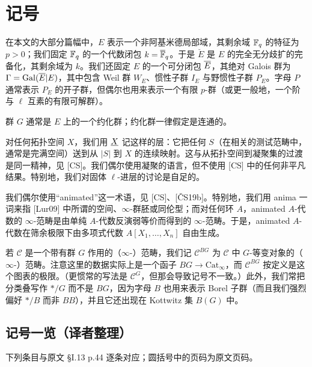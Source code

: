 \section{记号}

在本文的大部分篇幅中，$E$ 表示一个非阿基米德局部域，其剩余域 $\mathbb{F}_q$ 的特征为 $p>0$；我们固定 $\mathbb{F}_q$ 的一个代数闭包 $k=\overline{\mathbb{F}}_q$。于是 $\breve{E}$ 是 $E$ 的完全无分歧扩的完备化，其剩余域为 $k$。我们还固定 $E$ 的一个可分闭包 $\overline{E}$，其绝对 Galois 群为 $\Gamma=\operatorname{Gal}(\overline{E}|E)$，其中包含 Weil 群 $W_E$、惯性子群 $I_E$ 与野惯性子群 $P_E$。字母 $P$ 通常表示 $P_E$ 的开子群，但偶尔也用来表示一个有限 $p$-群（或更一般地，一个阶与 $\ell$ 互素的有限可解群）。

群 $G$ 通常是 $E$ 上的一个约化群；约化群一律假定是连通的。

对任何拓扑空间 $X$，我们用 $\underline{X}$ 记这样的层：它把任何 $S$（在相关的测试范畴中，通常是完满空间）送到从 $|S|$ 到 $X$ 的连续映射。这与从拓扑空间到凝聚集的过渡是同一精神，见 [CS]。我们偶尔使用凝聚的语言，但不使用 [CS] 中的任何非平凡结果。特别地，我们对固体 $\ell$-进层的讨论是自足的。

我们偶尔使用“animated”这一术语，见 [CS]、[\v{C}S19b]。特别地，我们用 anima 一词来指 [Lur09] 中所谓的空间、$\infty$-群胚或同伦型；而对任何环 $A$，animated $A$-代数的 $\infty$-范畴是由单纯 $A$-代数反演弱等价而得到的 $\infty$-范畴。于是，animated $A$-代数在筛余极限下由多项式代数 $A[X_1,\dots,X_n]$ 自由生成。

若 $\mathcal{C}$ 是一个带有群 $G$ 作用的（$\infty$-）范畴，我们记 $\mathcal{C}^{BG}$ 为 $\mathcal{C}$ 中 $G$-等变对象的（$\infty$-）范畴。注意这里的数据实际上是一个函子 $BG\to\mathrm{Cat}_\infty$，而 $\mathcal{C}^{BG}$ 按定义是这个图表的极限。（更惯常的写法是 $\mathcal{C}^G$，但那会导致记号不一致。）此外，我们常把分类叠写作 $\ast/G$ 而不是 $BG$，因为字母 $B$ 也用来表示 Borel 子群（而且我们强烈偏好 $\ast/B$ 而非 $BB$），并且它还出现在 Kottwitz 集 $B(G)$ 中。

\subsection*{记号一览（译者整理）}

\noindent 下列条目与原文 §I.13 p.44 逐条对应；圆括号中的页码为原文页码。

